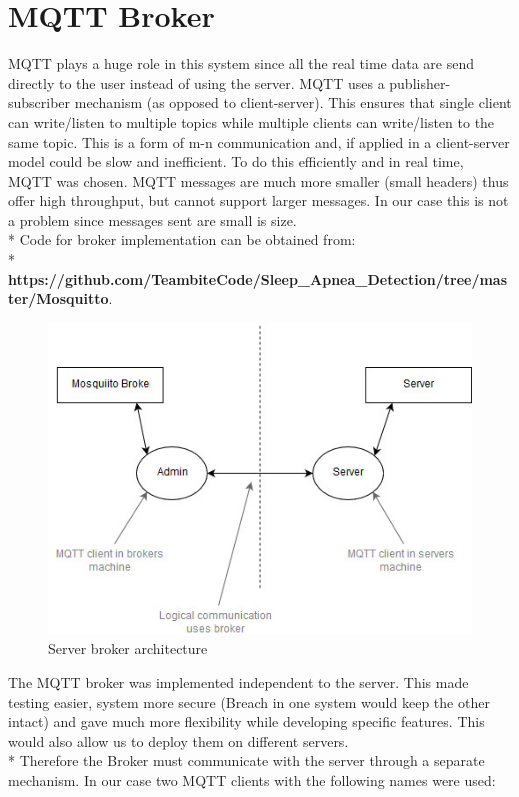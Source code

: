\documentclass{report}
\begin{document}
\clearpage
\section{MQTT Broker}

MQTT plays a huge role in this system since all the real time data are send directly to the user instead of using the server. MQTT uses a publisher-subscriber mechanism (as opposed to client-server). This ensures that single client can write/listen to multiple topics while multiple clients can write/listen to the same topic. This is a form of m-n communication and, if applied in a client-server model could be slow and inefficient. To do this efficiently and in real time, MQTT was chosen. MQTT messages are much more smaller (small headers) thus offer high throughput, but cannot support larger messages. In our case this is not a problem since messages sent are small is size.\\*
Code for broker implementation can be obtained from:\\*
\textbf{https://github.com/TeambiteCode/Sleep\_Apnea\_Detection/tree/master/Mosquitto}.\\


\begin{figure}[H]
    \centering
    \includegraphics[scale=0.6]{ServerBroker.jpg}
    \caption{Server broker architecture}
    \label{fig:Server broker architecture}
\end{figure}


The MQTT broker was implemented independent to the server. This made testing easier, system more secure (Breach in one system would keep the other intact) and gave much more flexibility while developing specific features. This would also allow us to deploy them on different servers.\\*
Therefore the Broker must communicate with the server through a separate mechanism. In our case two MQTT clients with the following names were used:
\end{document}
